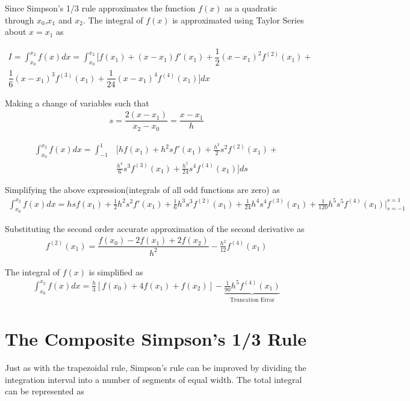 \documentclass[book.tex]{subfiles}
\begin{document}
Since Simpson's 1/3 rule approximates the function $f(x)$ as a quadratic through $x_0$,$x_1$ and $x_2$. The integral of $f(x)$ is approximated using Taylor Series about $x=x_1$ as

\begin{align}
I = \int_{x_0}^{x_2}f(x)dx = \int_{x_0}^{x_2}[f(x_{1}) + (x-x_1)f'(x_1) + \dfrac{1}{2}(x-x_1)^2f^{(2)}(x_1) + \\
\dfrac{1}{6}(x-x_1)^3f^{(3)}(x_1) + \dfrac{1}{24}(x-x_1)^4f^{(4)}(x_1)]dx
\end{align}

Making a change of variables such that
\begin{align}
s = \dfrac{2(x-x_1)}{x_2-x_0} = \dfrac{x-x_1}{h}
\end{align}

\begin{align}
\int_{x_0}^{x_2}f(x)dx =  \int_{-1}^{1}&[hf(x_{1}) + h^2sf'(x_1) + \frac{h^3}{2}s^2f^{(2)}(x_1) + \\
&\frac{h^4}{6}s^3f^{(3)}(x_1) + \frac{h^5}{24}s^4f^{(4)}(x_1)]ds 
\end{align}

Simplifying the above expression(integrals of all odd functions are zero) as
\begin{align}
\int_{x_0}^{x_2}f(x)dx = hsf(x_{1}) + \frac{1}{2}h^2s^2f'(x_1) +  \frac{1}{6}h^3s^3f^{(2)}(x_1) + \frac{1}{24}h^4s^4f^{(3)}(x_1) + \frac{1}{120}h^5s^5f^{(4)}(x_1)\rvert_{s=-1}^{s=1}
\end{align}

Substituting the second order accurate approximation of the second derivative as 
\begin{align}
f^{(2)}(x_1) = \dfrac{f(x_0) - 2f(x_1) + 2f(x_2)}{h^2} - \frac{h^2}{12}f^{(4)}(x_1)
\end{align}

The integral of $f(x)$ is simplified as
\begin{align}
\int_{x_0}^{x_2}f(x)dx =  \frac{h}{3}[f(x_0) + 4f(x_1) + f(x_2)] - \underbrace{\frac{1}{90}h^5f^{(4)}(x_1)}_{\text{Truncation Error}}
\end{align}

\section{The Composite Simpson's 1/3 Rule}
Just as with the trapezoidal rule, Simpson's rule can be improved by dividing the integration interval into a number of segments of equal width. The total integral can be represented as
\end{document}
